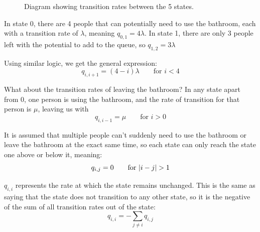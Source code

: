 \begin{figure}[H]
	\centering
	\caption{Diagram showing transition rates between the 5 states.}
	\label{fig: bathroom visual}
\end{figure}

In state 0, there are 4 people that can potentially need to use the bathroom, each with a transition rate of $\lambda$, meaning $q_{0, 1} = 4\lambda$. In state 1, there are only 3 people left with the potential to add to the queue, so $q_{1, 2} = 3\lambda$

Using similar logic, we get the general expression:
$$q_{i, i+1} = (4-i)\lambda \qquad \text{for } i < 4 $$

What about the transition rates of leaving the bathroom? In any state apart from 0, one person is using the bathroom, and the rate of transition for that person is $\mu$, leaving us with 
$$q_{i, i-1}=\mu \qquad \text{for } i > 0$$

It is assumed that multiple people can't suddenly need to use the bathroom or leave the bathroom at the exact same time, so each state can only reach the state one above or below it, meaning:
$$q_{i, j} = 0 \qquad \text{for } \lvert i-j\rvert>1 $$

$q_{i, i}$ represents the rate at which the state remains unchanged. This is the same as saying that the state does not transition to any other state, so it is the negative of the sum of all transition rates out of the state:
$$q_{i, i} = -\sum_{j \neq i} q_{i, j} $$

